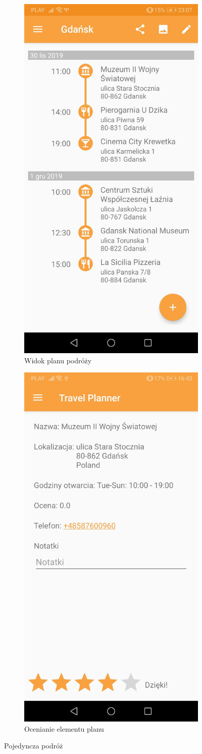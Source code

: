 \documentclass[10pt,twoside,a4paper]{report}
\begin{document}
\begin{figure}[h]
\centering
\begin{subfigure}{0.4\textwidth}
\centering
\includegraphics[width=0.9\linewidth, width=5cm]{planElements}
\caption{Widok planu podróży}
\label{fig:planElements}
\end{subfigure}
\begin{subfigure}{0.4\textwidth}
\centering
\includegraphics[width=0.9\linewidth, width=5cm]{ratePlace2}
\caption{Ocenianie elementu planu}
\label{fig:ratePlace2}
\end{subfigure}
\caption{Pojedyncza podróż}
\label{fig:podrecznik4}
\end{figure}
\FloatBarrier
\end{document}
